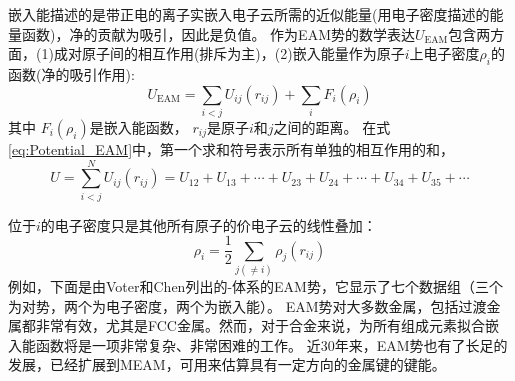 嵌入能描述的是带正电的离子实嵌入电子云所需的近似能量(用电子密度描述的能量函数)，净的贡献为吸引，因此是负值。%
作为\textrm{EAM}势的数学表达$U_{\mathrm{EAM}}$包含两方面，\textrm{(1)}成对原子间的相互作用(排斥为主)，\textrm{(2)}嵌入能量作为原子$i$上电子密度$\rho_i$的函数(净的吸引作用):
\begin{equation}
	U_{\mathrm{EAM}}=\sum_{i<j}U_{ij}(r_{ij})+\sum_iF_i(\rho_i)
	\label{eq:Potential_EAM}
\end{equation}
其中
$F_i(\rho_i)$是嵌入能函数，
$r_{ij}$是原子$i$和$j$之间的距离。
在式\eqref{eq:Potential_EAM}中，第一个求和符号表示所有单独的相互作用的和，%
\begin{equation}
	U=\sum_{i<j}^NU_{ij}(r_{ij})=U_{12}+U_{13}+\cdots+U_{23}+U_{24}+\cdots+U_{34}+U_{35}+\cdots
	\label{eq:EAM_pair}
\end{equation}

位于$i$的电子密度只是其他所有原子的价电子云的线性叠加：
\begin{equation}
	\rho_i=\dfrac12\sum_{j(\neq i)}\rho_j(r_{ij})
	\label{eq:EAM_rho}
\end{equation}
例如，下面是由\textrm{Voter}和\textrm{Chen}\cite{MRSSP82-175_1987}列出的-体系的\textrm{EAM}势，它显示了七个数据组（三个为对势，两个为电子密度，两个为嵌入能）。
\textrm{EAM}势对大多数金属，包括过渡金属都非常有效，尤其是\textrm{FCC}金属。然而，对于合金来说，为所有组成元素拟合嵌入能函数将是一项非常复杂、非常困难的工作。%
近30年来，\textrm{EAM}势也有了长足的发展，已经扩展到\textrm{MEAM}，可用来估算具有一定方向的金属键的键能\cite{PRB46-2727_1992}。

